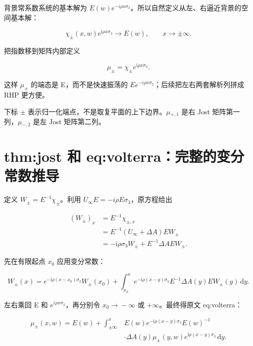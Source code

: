 背景常系数系统的基本解为 $E(w)e^{-i\rho{}x\sigma{}_{3}}$。所以自然定义从左、右逼近背景的空间基本解：\par

\[
\chi_\pm(x,w)e^{\mathrm{i}\rho x\sigma_3}
\longrightarrow E(w),\qquad x\to\pm\infty.
\]

把指数移到矩阵内部定义\par

\[
\mu_\pm=\chi_\pm e^{\mathrm{i}\rho x\sigma_3}.
\]

这样 $\mu_{\pm}$ 的端态是 E，而不是快速振荡的 $E e^{-i\rho{}x\sigma{}_{3}}$；后续把左右两套解析列拼成 RHP 更方便。\par

下标 $\pm{}$ 表示归一化端点，不是取复平面的上下边界。$\mu{}_{+,1}$ 是右 Jost 矩阵第一列，$\mu{}_{-,2}$ 是左 Jost 矩阵第二列。\par

\section{thm:jost 和 eq:volterra：完整的变分常数推导}

定义 $W_{\pm}=E^{-1}\chi_{\pm}$。利用 $U_{\infty}E=-i\rho{}E\sigma{}_{3}$，原方程给出\par

\[
\begin{aligned}
(W_\pm)_x
&=E^{-1}\chi_{\pm,x}\\
&=E^{-1}(U_\infty+\Delta A)E W_\pm\\
&=-\mathrm{i}\rho\sigma_3 W_\pm
+E^{-1}\Delta A E W_\pm.
\end{aligned}
\]

先在有限起点 $x_{0}$ 应用变分常数：\par

\[
W_\pm(x)
=e^{-\mathrm{i}\rho(x-x_0)\sigma_3}W_\pm(x_0)
+\int_{x_0}^{x}e^{-\mathrm{i}\rho(x-y)\sigma_3}
E^{-1}\Delta A(y)E W_\pm(y)\,\mathrm{d}y.
\]

左右乘回 E 和 $e^{i\rho{}x\sigma{}_{3}}$，再分别令 $x_{0}\to{}-\infty{}$ 或 $+\infty{}$。最终得原文 eq:volterra：\par

\[
\boxed{
\begin{aligned}
\mu_\pm(x,w)=E(w)
+\int_{\pm\infty}^{x}
&E(w)e^{-\mathrm{i}\rho(x-y)\sigma_3}E(w)^{-1}\\
&\cdot\Delta A(y)\mu_\pm(y,w)
e^{\mathrm{i}\rho(x-y)\sigma_3}\,\mathrm{d}y.
\end{aligned}}
\]

